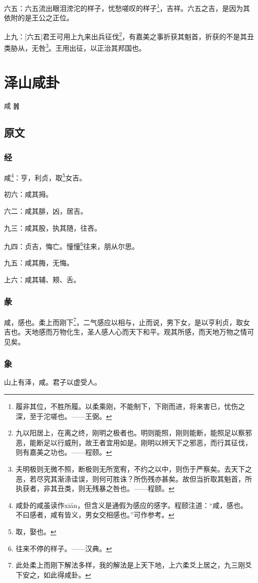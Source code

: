 \documentclass[12pt,oneside]{book}
\begin{document}
六五：六五流出眼泪滂沱的样子，忧愁嗟叹的样子\footnote{履非其位，不胜所履。以柔乘刚，不能制下，下刚而进，将来害已，忧伤之深，至于沱嗟也。——王弼。}，吉祥。六五之吉，是因为其依附的是王公之正位。

上九：[六五]君王可用上九来出兵征伐\footnote{九以阳居上，在离之终，刚明之极者也。明则能照，刚则能断，能照足以察邪恶，能断足以行威刑，故王者宜用如是。刚明以辨天下之邪恶，而行其征伐，则有嘉美之功也。——程颐。}，有嘉美之事折获其魁首，折获的不是其丑类胁从，无咎\footnote{夫明极则无微不照，断极则无所宽宥，不约之以中，则伤于严察矣。去天下之恶，若尽究其渐涤诖误，则何可胜诛？所伤残亦甚矣。故但当折取其魁首，所执获者，非其丑类，则无残暴之咎也。——程颐。}。王用出征，以正治其邦国也。


\chapter{泽山咸卦}
咸 {\Large ䷞}

\section{原文}

\subsection{经}
咸\footnote{咸卦的咸虽读作xián，但含义是通假为感应的感字。程颐注道：“咸，感也。不曰感者，咸有皆义，男女交相感也。”可作参考。}：亨，利贞，取\footnote{取，娶也。}女吉。

初六：咸其拇。

六二：咸其腓，凶，居吉。

九三：咸其股，执其随，往吝。

九四：贞吉，悔亡。憧憧\footnote{往来不停的样子。——汉典。}往来，朋从尔思。

九五：咸其脢，无悔。

上六：咸其辅、颊、舌。

\subsection{彖}
咸，感也。柔上而刚下\footnote{此处柔上而刚下解法多样，我的解法是上天下地，上六柔爻上居之，九三刚爻下安之，如此得咸卦。}，二气感应以相与，止而说，男下女，是以亨利贞，取女吉也。天地感而万物化生，圣人感人心而天下和平。观其所感，而天地万物之情可见矣。

\subsection{象}
山上有泽，咸。君子以虚受人。
\end{document}
